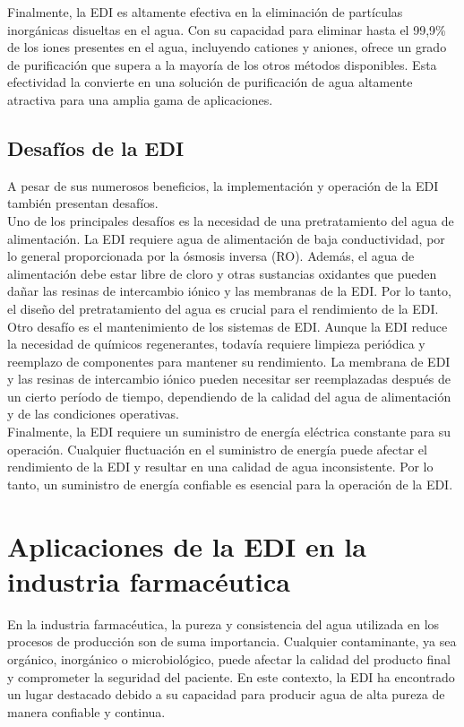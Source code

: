 Finalmente, la EDI es altamente efectiva en la eliminación de partículas inorgánicas disueltas en el agua. Con su capacidad
para eliminar hasta el 99,9\% de los iones presentes en el agua, incluyendo cationes y aniones, ofrece un grado de purificación
que supera a la mayoría de los otros métodos disponibles. Esta efectividad la convierte en una solución de purificación de
agua altamente atractiva para una amplia gama de aplicaciones.\\

\subsection{Desafíos de la EDI}
A pesar de sus numerosos beneficios, la implementación y operación de la EDI también presentan desafíos. \\

Uno de los principales desafíos es la necesidad de una pretratamiento del agua de alimentación. La EDI requiere agua de alimentación
de baja conductividad, por lo general proporcionada por la ósmosis inversa (RO). Además, el agua de alimentación debe estar libre
de cloro y otras sustancias oxidantes que pueden dañar las resinas de intercambio iónico y las membranas de la EDI. Por lo tanto,
el diseño del pretratamiento del agua es crucial para el rendimiento de la EDI. \\

Otro desafío es el mantenimiento de los sistemas de EDI. Aunque la EDI reduce la necesidad de químicos regenerantes, todavía requiere
limpieza periódica y reemplazo de componentes para mantener su rendimiento. La membrana de EDI y las resinas de intercambio iónico
pueden necesitar ser reemplazadas después de un cierto período de tiempo, dependiendo de la calidad del agua de alimentación y de las
condiciones operativas. \\

Finalmente, la EDI requiere un suministro de energía eléctrica constante para su operación. Cualquier fluctuación en el suministro
de energía puede afectar el rendimiento de la EDI y resultar en una calidad de agua inconsistente. Por lo tanto, un suministro de
energía confiable es esencial para la operación de la EDI. \\

\section{Aplicaciones de la EDI en la industria farmacéutica}
En la industria farmacéutica, la pureza y consistencia del agua utilizada en los procesos de producción son de suma importancia.
Cualquier contaminante, ya sea orgánico, inorgánico o microbiológico, puede afectar la calidad del producto final y comprometer la
seguridad del paciente. En este contexto, la EDI ha encontrado un lugar destacado debido a su capacidad para producir agua de alta
pureza de manera confiable y continua.\\

